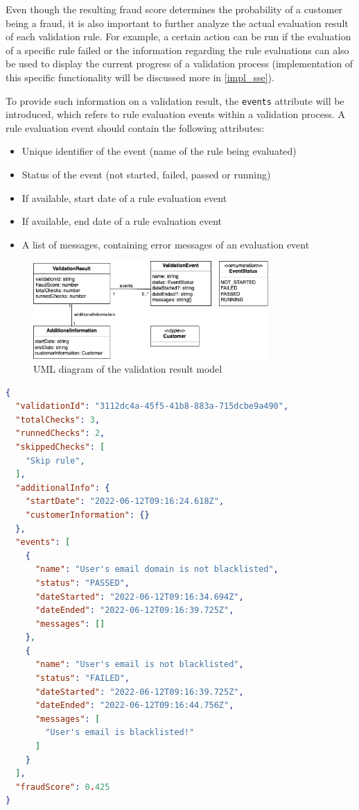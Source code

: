     Even though the resulting fraud score determines the probability of a customer being a fraud, it is also important to further analyze the actual evaluation result of each validation rule. For example, a certain action can be run if the evaluation of a specific rule failed or the information regarding the rule evaluations can also be used to display the current progress of a validation process (implementation of this specific functionality will be discussed more in \autoref{impl_sse}). 

    To provide such information on a validation result, the \verb;events; attribute will be introduced, which refers to rule evaluation events within a validation process. A rule evaluation event should contain the following attributes:

    \begin{itemize}
      \item Unique identifier of the event (name of the rule being evaluated)
      \item Status of the event (not started, failed, passed or running) 
      \item If available, start date of a rule evaluation event 
      \item If available, end date of a rule evaluation event 
      \item A list of messages, containing error messages of an evaluation event
    \end{itemize}

    \begin{figure}[!ht]
      \centering
      \includegraphics[width=0.8\textwidth]{diagrams/entity-validationresult.png}
      \caption{UML diagram of the validation result model}
      \label{fig:uml_validation_result}
    \end{figure}
    
    \begin{lstlisting}[caption={Validation result example (JSON)}, language=json]
{
  "validationId": "3112dc4a-45f5-41b8-883a-715dcbe9a490",
  "totalChecks": 3,
  "runnedChecks": 2,
  "skippedChecks": [
    "Skip rule",
  ],
  "additionalInfo": {
    "startDate": "2022-06-12T09:16:24.618Z",
    "customerInformation": {}
  },
  "events": [
    {
      "name": "User's email domain is not blacklisted",
      "status": "PASSED",
      "dateStarted": "2022-06-12T09:16:34.694Z",
      "dateEnded": "2022-06-12T09:16:39.725Z",
      "messages": []
    },
    {
      "name": "User's email is not blacklisted",
      "status": "FAILED",
      "dateStarted": "2022-06-12T09:16:39.725Z",
      "dateEnded": "2022-06-12T09:16:44.756Z",
      "messages": [
        "User's email is blacklisted!"
      ]
    }
  ],
  "fraudScore": 0.425  
}
    \end{lstlisting}
